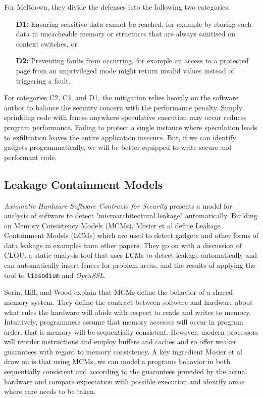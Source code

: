 \documentclass[11pt,conference]{IEEEtran}
\begin{document}
For Meltdown, they divide the defenses into the following two categories:
\begin{enumerate}
	\item[\textbf{D1:}] Ensuring sensitive data cannot be reached, for example by storing such data in uncacheable memory or structures that are always sanitised on context switches, or
	\item[\textbf{D2:}] Preventing faults from occurring, for example an access to a protected page from an unprivileged mode might return invalid values instead of triggering a fault.
\end{enumerate}

For categories C2, C3, and D1, the mitigation relies heavily on the software author to balance the security concern with the performance penalty.
Simply sprinkling code with fences anywhere speculative execution may occur reduces program performance.
Failing to protect a single instance where speculation leads to exfiltration leaves the entire application insecure.
But, if we can identify gadgets programmatically, we will be better equipped to write secure and performant code.

\subsection{Leakage Containment Models}

\textit{Axiomatic Hardware-Software Contracts for Security}\cite{mosier2022} presents a model for analysis of software to detect "microarchitectural leakage" automatically.
Building on Memory Consistency Models (MCMs), Mosier et al define Leakage Containment Models (LCMs) which are used to detect gadgets and other forms of data leakage in examples from other papers.
They go on with a discussion of CLOU, a static analysis tool that uses LCMs to detect leakage automatically and can automatically insert fences for problem areas, and the results of applying the tool to \texttt{libsodium} and \textit{OpenSSL}.

Sorin, Hill, and Wood explain that MCMs define the behavior of a shared memory system\cite{mcmprimer}.
They define the contract between software and hardware about what rules the hardware will abide with respect to reads and writes to memory.
Intuitively, programmers assume that memory accesses will occur in program order, that is memory will be sequentially consistent.
However, modern processors will reorder instructions and employ buffers and caches and so offer weaker guarantees with regard to memory consistency.
A key ingredient Mosier et al draw on is that using MCMs, we can model a programs behavior in both sequentially consistent and according to the guarantees provided by the actual hardware and compare expectation with possible execution and identify areas where care needs to be taken.
\end{document}
